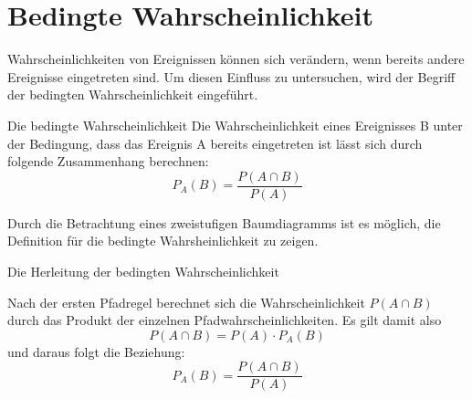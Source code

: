 \section{Bedingte Wahrscheinlichkeit}
Wahrscheinlichkeiten von Ereignissen können sich verändern, wenn bereits andere Ereignisse eingetreten sind. Um diesen Einfluss zu untersuchen, wird der Begriff der bedingten Wahrscheinlichkeit eingeführt.
\begin{defi}{Die bedingte Wahrscheinlichkeit}{}
   Die Wahrscheinlichkeit eines Ereignisses B unter der Bedingung, dass das Ereignis A bereits eingetreten ist lässt sich durch folgende Zusammenhang berechnen: $$P_A(B) = \dfrac{P(A\cap B)}{P(A)}$$   
\end{defi}
Durch die Betrachtung eines zweistufigen Baumdiagramms ist es möglich, die Definition für die bedingte Wahrsheinlichkeit zu zeigen.
\begin{merke*}{Die Herleitung der bedingten Wahrscheinlichkeit}{}
\begin{multicols}{2}

Nach der ersten Pfadregel berechnet sich die Wahrscheinlichkeit $P(A\cap B)$ durch das Produkt der einzelnen Pfadwahrscheinlichkeiten. Es gilt damit also $$P(A\cap B) = P(A) \cdot P_{A}(B)$$ und daraus folgt die Beziehung: $$P_{A}(B) = \dfrac{P(A \cap B)}{P(A)}$$
\end{multicols}
\end{merke*}
